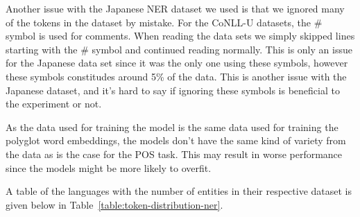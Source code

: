 Another issue with the Japanese NER dataset we used is that we ignored many of
the tokens in the dataset by mistake. For the CoNLL-U datasets, the \# symbol is
used for comments. When reading the data sets we simply skipped lines starting
with the \# symbol and continued reading normally. This is only an issue for the
Japanese data set since it was the only one using these symbols, however these
symbols constitudes around 5\% of the data. This is another issue with the
Japanese dataset, and it's hard to say if ignoring these symbols is beneficial
to the experiment or not.

As the data used for training the model is the same data used for training the
polyglot word embeddings, the models don't have the same kind of variety from
the data as is the case for the POS task. This may result in worse performance
since the models might be more likely to overfit.

A table of the languages with the number of entities in their respective dataset
is given below in Table~\ref{table:token-distribution-ner}. 

